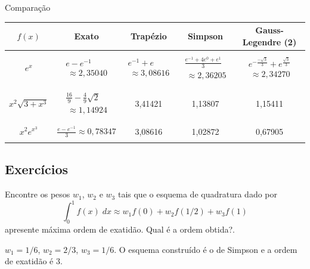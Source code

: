 \begin{ex} Comparação
  \begin{small}
\begin{tabular}{|c|c|c|c|c|}
\hline
$f(x)$&Exato&Trapézio&Simpson&Gauss-Legendre (2)\\
\hline
&&&&\\
$\displaystyle e^{x}$&$\displaystyle \begin{array}{l}e-e^{-1}\\~\approx 2,35040\end{array}$&$\displaystyle \begin{array}{l}e^{-1}+e \\ ~\approx 3,08616 \end{array}$&$\begin{array}{l}\displaystyle \frac{e^{-1}+4e^{0}+e^{1}}{3}\\ ~\approx  2,36205\end{array}$&$\begin{array}{l}\displaystyle e^{-\frac{-\sqrt{3}}{3}}+e^{\frac{\sqrt{3}}{3}}\\ ~\approx   2,34270\end{array}$\\
&&&&\\
 \hline
&&&&\\
$\displaystyle x^2\sqrt{3+x^3}$&$\begin{array}{l}\frac{16}{9}-\frac{4}{9}\sqrt{2}\\~\approx 1,14924\end{array}$&3,41421  & 1,13807 & 1,15411\\
&&&&\\
 \hline
&&&&\\
  $\displaystyle x^2e^{x^3}$&$\frac{e-e^{-1}}{3}\approx 0,78347$ & 3,08616     & 1,02872  & 0,67905\\
&&&&\\
 \hline
    \end{tabular}
  \end{small}
\end{ex}

\subsection*{Exercícios}

\begin{exer}
Encontre os pesos $w_1$, $w_2$ e $w_3$ tais que o esquema de quadratura dado por
\begin{equation} \int_{0}^{1}f(x)\;dx\approx w_1f(0)+w_2f(1/2)+w_3 f(1) \end{equation}
apresente máxima ordem de exatidão. Qual é a ordem obtida?.
\end{exer}
\begin{resp}

 $w_1=1/6$, $w_2=2/3$, $w_3=1/6$. O esquema construído é o de Simpson e a ordem de exatidão é 3.

\end{resp}

